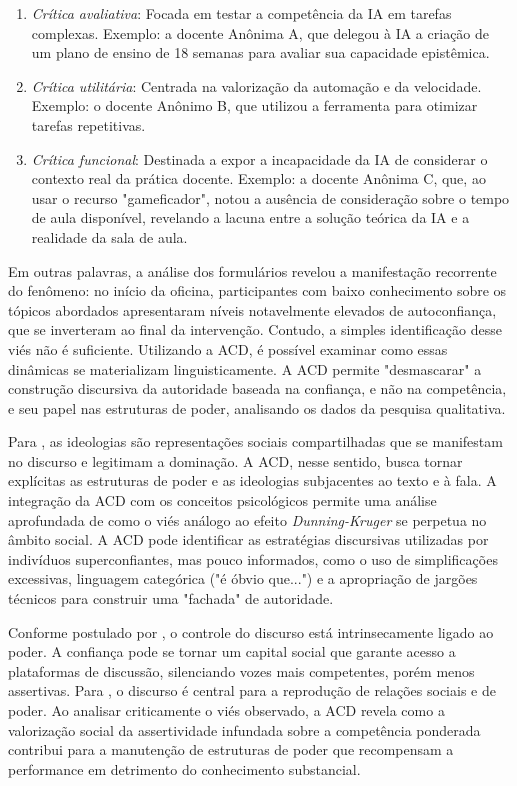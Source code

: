 \documentclass[portuguese]{textolivre}
\begin{document}
\begin{enumerate}
    \item \textit{Crítica avaliativa}: Focada em testar a competência da IA em tarefas complexas. Exemplo: a docente Anônima A, que delegou à IA a criação de um plano de ensino de 18 semanas para avaliar sua capacidade epistêmica.
    \item \textit{Crítica utilitária}: Centrada na valorização da automação e da velocidade. Exemplo: o docente Anônimo B, que utilizou a ferramenta para otimizar tarefas repetitivas.
    \item \textit{Crítica funcional}: Destinada a expor a incapacidade da IA de considerar o contexto real da prática docente. Exemplo: a docente Anônima C, que, ao usar o recurso "gameficador", notou a ausência de consideração sobre o tempo de aula disponível, revelando a lacuna entre a solução teórica da IA e a realidade da sala de aula.
\end{enumerate}

Em outras palavras, a análise dos formulários revelou a manifestação recorrente do fenômeno: no início da oficina, participantes com baixo conhecimento sobre os tópicos abordados apresentaram níveis notavelmente elevados de autoconfiança, que se inverteram ao final da intervenção. Contudo, a simples identificação desse viés não é suficiente. Utilizando a ACD, é possível examinar como essas dinâmicas se materializam linguisticamente. A ACD permite "desmascarar" a construção discursiva da autoridade baseada na confiança, e não na competência, e seu papel nas estruturas de poder, analisando os dados da pesquisa qualitativa.

Para \textcite{vandijk2008discurso}, as ideologias são representações sociais compartilhadas que se manifestam no discurso e legitimam a dominação. A ACD, nesse sentido, busca tornar explícitas as estruturas de poder e as ideologias subjacentes ao texto e à fala. A integração da ACD com os conceitos psicológicos permite uma análise aprofundada de como o viés análogo ao efeito \textit{Dunning-Kruger} se perpetua no âmbito social. A ACD pode identificar as estratégias discursivas utilizadas por indivíduos superconfiantes, mas pouco informados, como o uso de simplificações excessivas, linguagem categórica ("é óbvio que...") e a apropriação de jargões técnicos para construir uma "fachada" de autoridade.

Conforme postulado por \textcite{vandijk2008discurso}, o controle do discurso está intrinsecamente ligado ao poder. A confiança pode se tornar um capital social que garante acesso a plataformas de discussão, silenciando vozes mais competentes, porém menos assertivas. Para \textcite{fairclough2003analysing}, o discurso é central para a reprodução de relações sociais e de poder. Ao analisar criticamente o viés observado, a ACD revela como a valorização social da assertividade infundada sobre a competência ponderada contribui para a manutenção de estruturas de poder que recompensam a performance em detrimento do conhecimento substancial.
\end{document}
